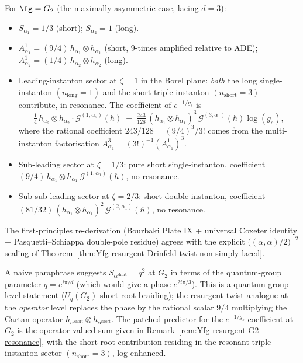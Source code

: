 \begin{remark}
\label{rem:Yfg-resurgent-G2-resonance}
For $\fg = G_2$ \textup{(}the maximally asymmetric case, lacing
$d = 3$\textup{):}
\begin{itemize}
\item $S_{\alpha_1} = 1/3$ \textup{(}short\textup{);}
 $S_{\alpha_2} = 1$ \textup{(}long\textup{).}
\item $A^1_{\alpha_1} = (9/4)\, h_{\alpha_1} \otimes h_{\alpha_1}$
 \textup{(}short, $9$-times amplified relative to ADE\textup{);}
 $A^1_{\alpha_2} = (1/4)\, h_{\alpha_2} \otimes h_{\alpha_2}$
 \textup{(}long\textup{).}
\item Leading-instanton sector at $\zeta = 1$ in the Borel plane:
 \emph{both} the long single-instanton $(n_{\mathrm{long}} = 1)$
 and the short triple-instanton $(n_{\mathrm{short}} = 3)$
 contribute, in resonance. The coefficient of $e^{-1/g_s}$ is
 \[
 \tfrac{1}{4}\, h_{\alpha_2} \otimes h_{\alpha_2}
 \cdot \mathcal{G}^{(1, \alpha_2)}(\hbar)
 \;+\; \tfrac{243}{128}\,
 (h_{\alpha_1} \otimes h_{\alpha_1})^3\,
 \mathcal{G}^{(3, \alpha_1)}(\hbar) \log(g_s),
 \]
 where the rational coefficient $243/128 = (9/4)^3 / 3!$ comes
 from the multi-instanton factorisation
 $A^3_{\alpha_1} = (3!)^{-1} (A^1_{\alpha_1})^3$.
\item Sub-leading sector at $\zeta = 1/3$: pure short single-instanton,
 coefficient $(9/4)\, h_{\alpha_1} \otimes h_{\alpha_1}\,
 \mathcal{G}^{(1, \alpha_1)}(\hbar)$, no resonance.
\item Sub-sub-leading sector at $\zeta = 2/3$: short
 double-instanton, coefficient
 $(81/32)\, (h_{\alpha_1} \otimes h_{\alpha_1})^2\,
 \mathcal{G}^{(2, \alpha_1)}(\hbar)$, no resonance.
\end{itemize}
The first-principles re-derivation \textup{(}Bourbaki Plate IX +
universal Coxeter identity + Pasquetti--Schiappa double-pole
residue\textup{)} agrees with the explicit
$\bigl((\alpha, \alpha)/2\bigr)^{-2}$ scaling of
Theorem~\ref{thm:Yfg-resurgent-Drinfeld-twist-non-simply-laced}.
\end{remark}

\begin{remark}
\label{rem:Yfg-resurgent-G2-patched-predictor}
A naive paraphrase suggests
$S_{\alpha^{\mathrm{short}}} = q^2$ at $G_2$ in terms of the
quantum-group parameter $q = e^{i\pi/d}$
\textup{(}which would give a phase $e^{2 i \pi / 3}$\textup{).}
This is a quantum-group-level statement
\textup{(}$U_q(G_2)$ short-root braiding\textup{);} the resurgent
twist analogue at the \emph{operator} level replaces the phase by the
rational scalar $9/4$ multiplying the Cartan operator
$h_{\alpha^{\mathrm{short}}} \otimes h_{\alpha^{\mathrm{short}}}$.
The patched predictor for the $e^{-1/g_s}$ coefficient at $G_2$ is
the operator-valued sum given in
Remark~\ref{rem:Yfg-resurgent-G2-resonance}, with the short-root
contribution residing in the resonant triple-instanton sector
$(n_{\mathrm{short}} = 3)$, log-enhanced.
\end{remark}

